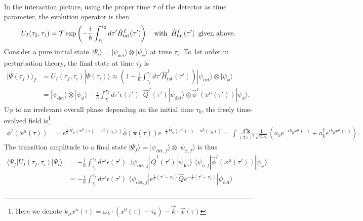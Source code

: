 \documentclass[../QFT_main.tex]{subfiles}
\begin{document}
\begin{mytheorem}
In the interaction picture, using the proper time $\tau$ of the detector as time parameter, the evolution operator is then
\begin{align}
    U_I(\tau_2,\tau_1) = \mathcal{T} \exp\left(-\frac{i}{\hbar} \int_{\tau_1}^{\tau_2} d\tau' \hat{H}_{\mathrm{int}}^I(\tau')\right)\quad\text{with\, $\hat{H}_{\mathrm{int}}^I(\tau')$\,  given above.}
\end{align}
Consider a pure initial state $|\Psi_i\rangle = |\psi_{\mathrm{det}}\rangle \otimes |\psi_{\phi}\rangle$ at time $\tau_i$.
To 1st order in perturbation theory, the final state at time $\tau_f$ is
\begin{align}
    |\Psi(\tau_f)\rangle_I &= U_I(\tau_f,\tau_i) |\Psi(\tau_i)\rangle \approx \left(1 -\frac{i}{\hbar} \int_{\tau_i}^{\tau_f} d\tau' \hat{H}_{\mathrm{int}}^I(\tau')\right) |\psi_{\mathrm{det}}\rangle \otimes |\psi_{\phi}\rangle \\
    &= |\psi_{\mathrm{det}}\rangle \otimes |\psi_{\phi}\rangle - \frac{i}{\hbar} \int_{\tau_i}^{\tau_f} d\tau' \epsilon(\tau') \,\,\,\hat{Q}^I(\tau') |\psi_{\mathrm{det}}\rangle \otimes \hat{\phi}^I(x^\mu(\tau')) |\psi_{\phi}\rangle.
\end{align}
Up to an irrelevant overall phase depending on the initial time $\tau_0$, the freely time-evolved field is\footnote{Here we denote $k_\mu x^\mu(\tau)= \omega_k\cdot(x^0(\tau)\!-\!\tau_0)- \vec{k}\cdot \vec{x}(\tau)$} 
\begin{align}
    \phi^I(x^\mu(\tau)) &= e^{\frac{i}{\hbar} \hat{H}_{\phi} (x^0(\tau)-x^0(\tau_0))} \hat{\phi}(\mathbf{x}(\tau)) e^{-\frac{i}{\hbar} \hat{H}_{\phi} (x^0(\tau)-x^0(\tau_0))} = \int \frac{d^3\mathbf{k}}{(2\pi)^3} \frac{1}{\sqrt{2\omega_k}} \left( a_k e^{-i k_\mu x^\mu(\tau)} + a_k^{\dagger} e^{i k_\mu x^\mu(\tau)} \right).
\end{align}
The transition amplitude to a final state $|\Psi_f\rangle = |\psi_{\mathrm{det},f}\rangle \otimes |\psi_{\phi,f}\rangle$ is thus
{\small
\begin{align}
    \langle\Psi_f | U_I(\tau_f,\tau_i) | \Psi_i\rangle &= - \frac{i}{\hbar} \int_{\tau_i}^{\tau_f} d\tau' \epsilon(\tau') \,\,\,\langle \psi_{\mathrm{det},f} | \hat{Q}^I(\tau') |\psi_{\mathrm{det}}\rangle \,\, \langle \psi_{\phi,f} | \hat{\phi}^I(x^\mu(\tau')) |\psi_{\phi}\rangle
    \\
    &=
    - \frac{i}{\hbar} \int_{\tau_i}^{\tau_f} d\tau' \epsilon(\tau') \,\,\langle \psi_{\mathrm{det},f} | e^{\frac{i}{\hbar}(\tau'-\tau_0)}\hat{Q} e^{-\frac{i}{\hbar}(\tau'-\tau_0)} |\psi_{\mathrm{det}}\rangle \\

\end{align}}
\end{mytheorem}
\end{document}
